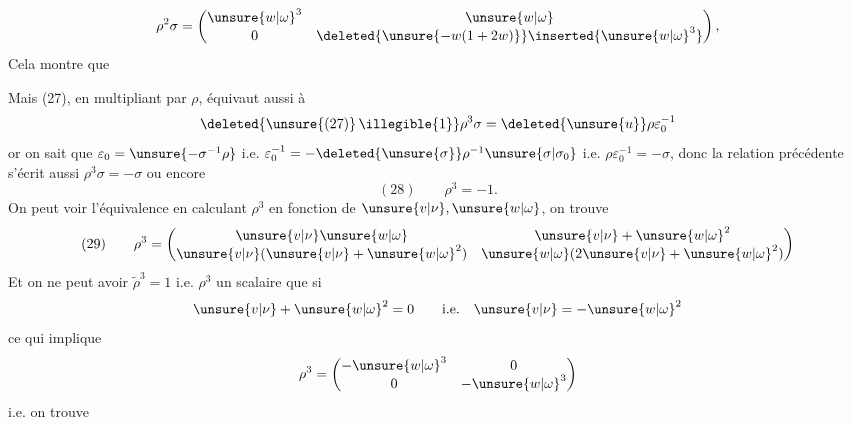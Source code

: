 

\[
\rho^2\sigma=\begin{pmatrix}\unsure{w|\omega}^3&\unsure{w|\omega}\\0&\deleted{\unsure{-w(1+2w)}}\inserted{\unsure{w|\omega}^3}\end{pmatrix},
\]
Cela montre que
\inserted{
\[
\begin{gathered}(27\mathrm{bis})\qquad
\rho^2\sigma=\varepsilon_0^{-1}\Longleftrightarrow
\left\{\unsure{v|\nu}+\unsure{w|\omega}^2=0,\ \unsure{w|\omega}^3=1\right.
\\[4pt]
\left(\Rightarrow \unsure{v|\nu}=-\unsure{w|\omega}^2=-1/\unsure{w|\omega}\ \text{i.e.}\ \unsure{w|\omega}=-1/\unsure{v|\nu},\ \mathrm{OK}\right)
\end{gathered}\]
}

Mais (27), en multipliant par $\rho$, équivaut aussi à
\[\deleted{\unsure{(27)}\,\illegible{1}}\rho^3\sigma=\deleted{\unsure{u}}\rho\varepsilon_0^{-1}
\]
or on sait que $\varepsilon_0=\unsure{-\sigma^{-1}\rho}$  i.e. $\varepsilon_0^{-1}=-\deleted{\unsure{\sigma}}\rho^{-1}\unsure{\sigma|\sigma_0}$
i.e. $\rho\varepsilon_0^{-1}=-\sigma$, donc la relation précédente s'écrit aussi $\rho^3\sigma=-\sigma$ ou encore
\[
(28)\qquad \boxed{\rho^3=-1}.
\]
On peut voir  l'équivalence  en calculant $\rho^3$ en fonction de $\unsure{v|\nu},\unsure{w|\omega}$, on trouve
\[
(29)\qquad
\rho^3=\begin{pmatrix}\unsure{v|\nu}\unsure{w|\omega}&\unsure{v|\nu}+\unsure{w|\omega}^2\\\unsure{v|\nu}(\unsure{v|\nu}+\unsure{w|\omega}^2)&\unsure{w|\omega}(2\unsure{v|\nu}+\unsure{w|\omega}^2)\end{pmatrix}
\]
Et on ne peut avoir $\widetilde\rho^3=1$ i.e. $\rho^3$ un scalaire que si 
\[
\unsure{v|\nu}+\unsure{w|\omega}^2=0\qquad\text{i.e.}\quad \unsure{v|\nu}=-\unsure{w|\omega}^2
\]
ce qui implique
\[
\rho^3=\begin{pmatrix}-\unsure{w|\omega}^3&0\\0&-\unsure{w|\omega}^3\end{pmatrix}
\]
i.e. on trouve

